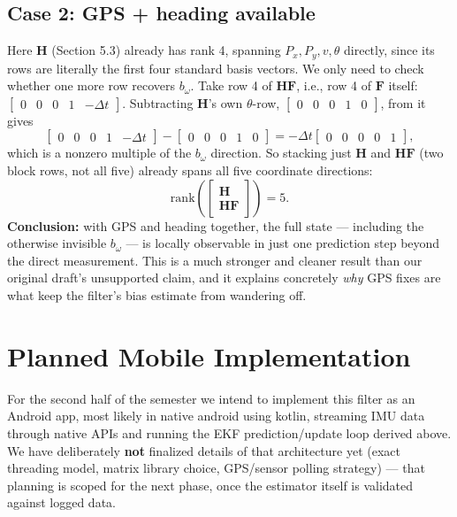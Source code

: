 \documentclass[11pt,a4paper]{article}
\begin{document}
\subsection{Case 2: GPS + heading available}
Here $\mathbf{H}$ (Section 5.3) already has rank 4, spanning $P_x, P_y, v, \theta$ directly, since its rows are literally the first four standard basis vectors. We only need to check whether one more row recovers $b_\omega$. Take row 4 of $\mathbf{H}\mathbf{F}$, i.e., row 4 of $\mathbf{F}$ itself: $\begin{bmatrix}0&0&0&1&-\Delta t\end{bmatrix}$. Subtracting $\mathbf{H}$'s own $\theta$-row, $\begin{bmatrix}0&0&0&1&0\end{bmatrix}$, from it gives
\begin{equation}
    \begin{bmatrix}0&0&0&1&-\Delta t\end{bmatrix} - \begin{bmatrix}0&0&0&1&0\end{bmatrix} = -\Delta t\begin{bmatrix}0&0&0&0&1\end{bmatrix},
\end{equation}
which is a nonzero multiple of the $b_\omega$ direction. So stacking just $\mathbf{H}$ and $\mathbf{H}\mathbf{F}$ (two block rows, not all five) already spans all five coordinate directions:
\begin{equation}
    \mathrm{rank}\!\left(\begin{bmatrix}\mathbf{H}\\ \mathbf{H}\mathbf{F}\end{bmatrix}\right) = 5.
\end{equation}
\textbf{Conclusion:} with GPS and heading together, the full state --- including the otherwise invisible $b_\omega$ --- is locally observable in just one prediction step beyond the direct measurement. This is a much stronger and cleaner result than our original draft's unsupported claim, and it explains concretely \emph{why} GPS fixes are what keep the filter's bias estimate from wandering off.

\section{Planned Mobile Implementation}

For the second half of the semester we intend to implement this filter as an Android app, most likely in native android using kotlin, streaming IMU data through native APIs  and running the EKF prediction/update loop derived above. We have deliberately \textbf{not} finalized details of that architecture yet (exact threading model, matrix library choice, GPS/sensor polling strategy) --- that planning is scoped for the next phase, once the estimator itself is validated against logged data.
\end{document}
